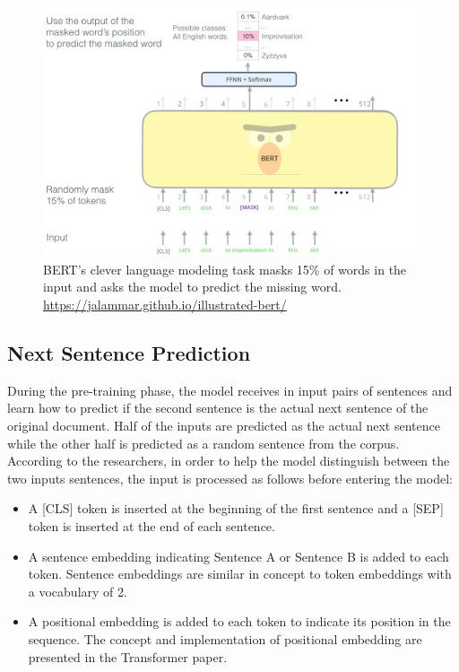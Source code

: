 \begin{figure}[h]
\centering
\includegraphics[width=1\textwidth]{BERT-language-modeling-masked-lm.png}
\caption{BERT's clever language modeling task masks 15{\%} of words in the input and asks the model to predict the missing word. \url{https://jalammar.github.io/illustrated-bert/}}
\label{fig:MLM}
\end{figure}


\subsection{Next Sentence Prediction}
During the pre-training phase, the model receives in input pairs of sentences and learn how to predict if the second sentence is the actual next sentence of the original document. Half of the inputs are predicted as the actual next sentence while the other half is predicted as a random sentence from the corpus.\\

According to the researchers, in order to help the model distinguish between the two inputs sentences, the input is processed as follows before entering the model:
\begin{itemize}

    \item A [CLS] token is inserted at the beginning of the first sentence and a [SEP] token is inserted at the end of each sentence.
    \item A sentence embedding indicating Sentence A or Sentence B is added to each token. Sentence embeddings are similar in concept to token embeddings with a vocabulary of 2.
    \item A positional embedding is added to each token to indicate its position in the sequence. The concept and implementation of positional embedding are presented in the Transformer paper.
\end{itemize}

